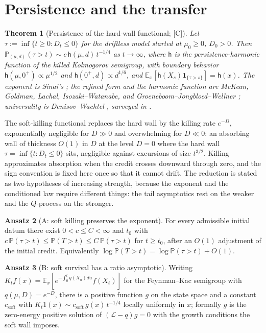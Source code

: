 \documentclass[11pt]{article}
\newtheorem{theorem}{Theorem}[section]
\theoremstyle{definition}
\newtheorem{ansatz}[theorem]{Ansatz}
\theoremstyle{remark}
\newcommand{\PP}{\mathbb{P}}
\newcommand{\E}{\mathbb{E}}
\newcommand{\one}{\mathbf{1}}
\newcommand{\hm}{\mathsf{h}}
\newcommand{\Lc}{\mathcal{L}}
\begin{document}
\section{Persistence and the transfer}\label{sec:persist}

\begin{theorem}[Persistence of the hard-wall functional; {[C]}]
\label{thm:persist}
Let $\tau:=\inf\{t\ge0:D_t\le0\}$ for the driftless model started at
$\mu_0\ge0$, $D_0>0$. Then
$\PP_{(\mu,d)}(\tau>t)\sim c\,\hm(\mu,d)\,t^{-1/4}$ as $t\to\infty$,
where $\hm$ is the persistence-harmonic function of the killed
Kolmogorov semigroup, with boundary behavior
$\hm(\mu,0^+)\propto\mu^{1/2}$ and $\hm(0^+,d)\propto d^{1/6}$, and
$\E_x[\hm(X_s)\one_{\{\tau>s\}}]=\hm(x)$. The exponent is Sinai's
\cite{Sin92}; the refined form and the harmonic function are
McKean, Goldman, Lachal, Isozaki--Watanabe, and
Groeneboom--Jongbloed--Wellner
\cite{McK63,Gol71,Lac91,IW94,GJW99}; universality is
Denisov--Wachtel \cite{DW15}, surveyed in \cite{AS15,BMS13}.
\end{theorem}

The soft-killing functional replaces the hard wall by the killing rate
$e^{-D}$, exponentially negligible for $D\gg0$ and overwhelming for
$D\ll0$: an absorbing wall of thickness $O(1)$ in $D$ at the level
$D=0$ where the hard wall $\tau=\inf\{t:D_t\le0\}$ sits, negligible
against excursions of size $t^{3/2}$. Killing approximates absorption
when the credit crosses downward through zero, and the sign convention
is fixed here once so that it cannot drift. The reduction is stated as two hypotheses of increasing strength,
because the exponent and the conditioned law require different
things: the tail asymptotics rest on the weaker and the $Q$-process
on the stronger.

\begin{ansatz}[A: soft killing preserves the exponent]\label{ans:soft}
For every admissible initial datum there exist
$0<c\le C<\infty$ and $t_0$ with
$c\,\PP(\tau>t)\le\PP(T>t)\le C\,\PP(\tau>t)$ for $t\ge t_0$, after an
$O(1)$ adjustment of the initial credit. Equivalently
$\log\PP(T>t)=\log\PP(\tau>t)+O(1)$.
\end{ansatz}

\begin{ansatz}[B: soft survival has a ratio asymptotic]\label{ans:ratio}
Writing $K_tf(x)=\E_x[e^{-\int_0^tq(X_u)du}f(X_t)]$ for the
Feynman--Kac semigroup with $q(\mu,D)=e^{-D}$, there is a positive
function $g$ on the state space and a constant $c_{\mathrm{soft}}$ with
$K_t1(x)\sim c_{\mathrm{soft}}\,g(x)\,t^{-1/4}$ locally uniformly in
$x$; formally $g$ is the zero-energy positive solution of
$(\Lc-q)g=0$ with the growth conditions the soft wall imposes.
\end{ansatz}
\end{document}
